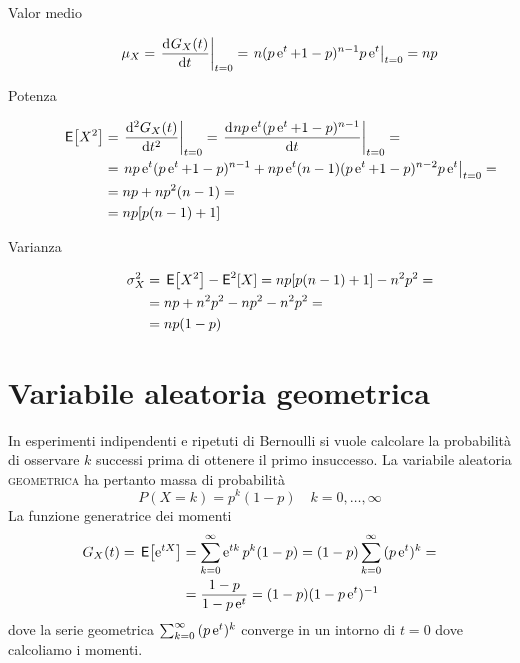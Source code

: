 \begin{description}
\item[Valor medio]
\begin{equation}
	\mu_X=\restrict{\deriv{G_X(t)}{t}}{t=0}=\restrict{n(p\e{t}+1-p)^{n-1}p\e{t}}{t=0}=n p
\end{equation}
\item[Potenza]
\begin{equation}
\begin{split}
	\E{X^2}&=\restrict{\deriv[2]{G_X(t)}{t}}{t=0}=\restrict{\deriv{np\e{t}(p\e{t}+1-p)^{n-1}}{t}}{t=0}=\\
	&=\restrict{np\e{t}(p\e{t}+1-p)^{n-1}+np\e{t}(n-1)(p\e{t}+1-p)^{n-2}p\e{t}}{t=0}=\\
	&=np+np^2(n-1)=\\
	&=np[p(n-1)+1]
\end{split}
\end{equation}
\item[Varianza]
\begin{equation}
\begin{split}
	\sigma^2_X&=\E{X^2}-\Esp^2[X]=np[p(n-1)+1]-n^2p^2=\\
	&=np+n^2p^2-np^2-n^2p^2=\\
	&=np(1-p)
\end{split}
\end{equation}
\end{description}

\section{Variabile aleatoria geometrica}
In esperimenti indipendenti e ripetuti di Bernoulli si vuole calcolare la probabilità di osservare $k$ successi prima di ottenere il primo insuccesso. La variabile aleatoria \textsc{geometrica} ha pertanto massa di probabilità
\begin{equation}
	P(X=k)=p^k(1-p)\quad k=0,\dots,\infty
\end{equation}
La funzione generatrice dei momenti
\begin{equation}
\begin{split}
	G_X(t)=\E{\e{t X}}&=\sum_{k=0}^{\infty}{\e{t k}p^k(1-p)}=(1-p)\sum_{k=0}^{\infty}{(p\e{t})^k}=\\
	&=\frac{1-p}{1-p\e{t}}=(1-p)(1-p\e{t})^{-1}
\end{split}
\end{equation}
dove la serie geometrica $\sum_{k=0}^{\infty}{(p\e{t})^k}$ converge in un intorno di $t=0$ dove calcoliamo i momenti.

